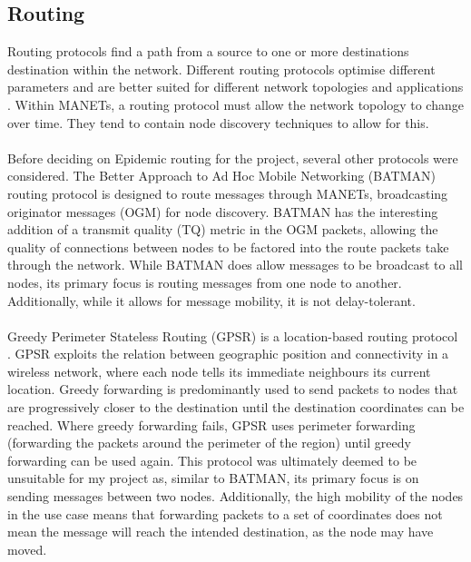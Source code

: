 \documentclass[12pt,a4paper]{report}
\begin{document}
\subsection{Routing}
Routing protocols find a path from a source to one or more destinations destination within the network. Different routing protocols optimise different parameters and are better suited for different network topologies and applications \cite{princom}. Within MANETs, a routing protocol must allow the network topology to change over time. They tend to contain node discovery techniques to allow for this. \\ \\
Before deciding on Epidemic routing for the project, several other protocols were considered. The Better Approach to Ad Hoc Mobile Networking (BATMAN) routing protocol \cite{batman} is designed to route messages through MANETs, broadcasting originator messages (OGM) for node discovery. BATMAN has the interesting addition of a transmit quality (TQ) metric in the OGM packets, allowing the quality of connections between nodes to be factored into the route packets take through the network. While BATMAN does allow messages to be broadcast to all nodes, its primary focus is routing messages from one node to another. Additionally, while it allows for message mobility, it is not delay-tolerant.\\ \\
Greedy Perimeter Stateless Routing (GPSR) is a location-based routing protocol \cite{gpsr}. GPSR exploits the relation between geographic position and connectivity in a wireless network, where each node tells its immediate neighbours its current location. Greedy forwarding is predominantly used to send packets to nodes that are progressively closer to the destination until the destination coordinates can be reached. Where greedy forwarding fails, GPSR uses perimeter forwarding (forwarding the packets around the perimeter of the region) until greedy forwarding can be used again. This protocol was ultimately deemed to be unsuitable for my project as, similar to BATMAN, its primary focus is on sending messages between two nodes. Additionally, the high mobility of the nodes in the use case means that forwarding packets to a set of coordinates does not mean the message will reach the intended destination, as the node may have moved. \\
\end{document}
